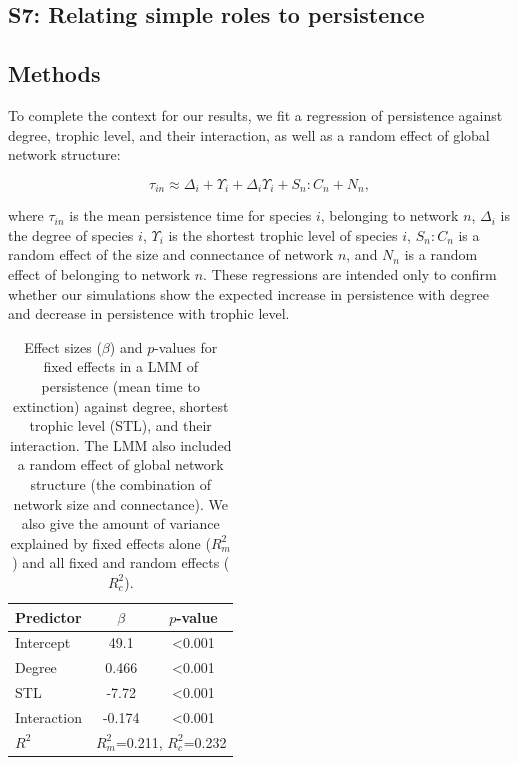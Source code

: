 \documentclass[12pt]{article}
\begin{document}
\begin{spacing}{2.0}
\clearpage


\section*{S7: Relating simple roles to persistence}

	\subsection*{Methods}

            To complete the context for our results, we fit a regression of persistence against degree, trophic level, and their interaction, as well as a random effect of global network structure:
            
            \begin{equation}
                \tau_{in} \approx \Delta_{i} + \Upsilon_{i} + \Delta_{i}\Upsilon_{i} + S_{n}:C_{n} + N_n ,
                \label{eq:persistence_degTL}
            \end{equation}
            
            \noindent where $\tau_{in}$ is the mean persistence time for species $i$, belonging to network $n$, $\Delta_i$ is the degree of species $i$, $\Upsilon_i$ is the shortest trophic level of species $i$, $S_{n}:C_{n}$ is a random effect of the size and connectance of network $n$, and $N_n$ is a random effect of belonging to network $n$.
            These regressions are intended only to confirm whether our simulations show the expected increase in persistence with degree and decrease in persistence with trophic level.


		\begin{table}[hb!]
			\caption{Effect sizes ($\beta$) and $p$-values for fixed effects in a LMM of persistence (mean time to extinction) against degree, shortest trophic level (STL), and their interaction. The LMM also included a random effect of global network structure (the combination of network size and connectance). We also give the amount of variance explained by fixed effects alone ($R^2_m$) and all fixed and random effects ($R^2_c$).}
			\label{tab:per_degTL}
			\begin{tabular}{l | c c |}
			Predictor & $\beta$ & $p$-value \\
			\hline
			Intercept & 49.1 & \textless0.001 \\
			Degree & 0.466 & \textless0.001 \\
			STL & -7.72 & \textless0.001 \\
			Interaction & -0.174 & \textless0.001 \\
			\hline
			$R^2$ & \multicolumn{2}{|c}{$R^2_m$=0.211, $R^2_c$=0.232} \\
			\end{tabular}
			\end{table}


\end{spacing}
\end{document}
